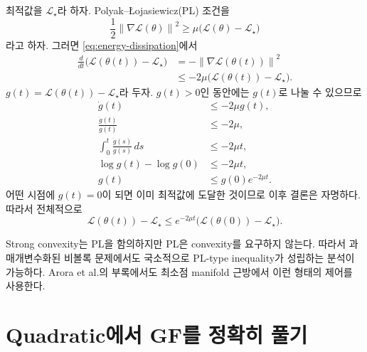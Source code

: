 \documentclass[11pt,a4paper,oneside,openany]{memoir}
\newcommand{\Loss}{\mathcal{L}}
\newcommand{\grad}{\nabla}
\newcommand{\norm}[1]{\left\lVert #1\right\rVert}
\theoremstyle{definition}
\begin{document}
최적값을 $\Loss_\star$라 하자. Polyak--\L{}ojasiewicz(PL) 조건을
\begin{equation}
  \frac12\norm{\grad\Loss(\theta)}^2
  \ge \mu\bigl(\Loss(\theta)-\Loss_\star\bigr)
  \label{eq:pl}
\end{equation}
라고 하자. 그러면 \eqref{eq:energy-dissipation}에서
\begin{align}
  \frac{d}{dt}\bigl(\Loss(\theta(t))-\Loss_\star\bigr)
  &= -\norm{\grad\Loss(\theta(t))}^2\\
  &\le -2\mu\bigl(\Loss(\theta(t))-\Loss_\star\bigr).
\end{align}
$g(t)=\Loss(\theta(t))-\Loss_\star$라 두자. $g(t)>0$인 동안에는 $g(t)$로 나눌 수 있으므로
\begin{align}
  \dot g(t)&\le -2\mu g(t),\\
  \frac{\dot g(t)}{g(t)}&\le -2\mu,\\
  \int_0^t \frac{\dot g(s)}{g(s)}\,ds&\le -2\mu t,\\
  \log g(t)-\log g(0)&\le -2\mu t,\\
  g(t)&\le g(0)e^{-2\mu t}.
\end{align}
어떤 시점에 $g(t)=0$이 되면 이미 최적값에 도달한 것이므로 이후 결론은 자명하다. 따라서 전체적으로
\begin{equation}
  \boxed{\Loss(\theta(t))-\Loss_\star
  \le e^{-2\mu t}\bigl(\Loss(\theta(0))-\Loss_\star\bigr).}
\end{equation}

\begin{suppbox}
Strong convexity는 PL을 함의하지만 PL은 convexity를 요구하지 않는다.
따라서 과매개변수화된 비볼록 문제에서도 국소적으로 PL-type inequality가 성립하는 분석이 가능하다.
Arora et al.의 부록에서도 최소점 manifold 근방에서 이런 형태의 제어를 사용한다.
\end{suppbox}

\section{Quadratic에서 GF를 정확히 풀기}
\end{document}
